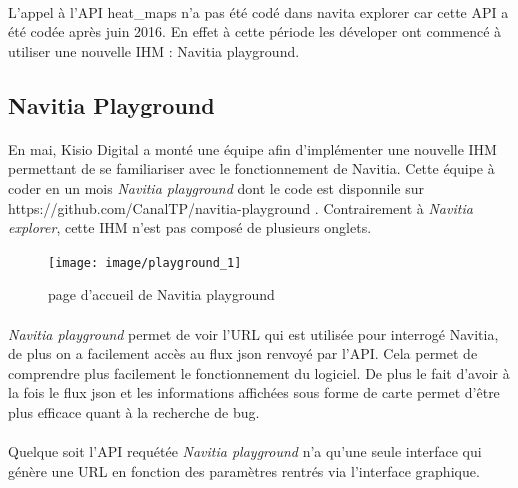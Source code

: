 \documentclass[a4paper]{report}
\begin{document}
\paragraph{} L'appel à l'API heat\_maps n'a pas été codé dans navita explorer car cette API a été codée après juin 2016. En effet à cette période les déveloper ont commencé à utiliser une nouvelle IHM : Navitia playground.


\subsection{Navitia Playground}

\paragraph{} En mai, Kisio Digital a monté une équipe afin d'implémenter une nouvelle IHM permettant de se familiariser avec le fonctionnement de Navitia. Cette équipe à coder en un mois \emph{Navitia playground} dont le code est disponnile sur \color{blue} https://github.com/CanalTP/navitia-playground \color{black}. Contrairement à \emph{Navitia explorer}, cette IHM n'est pas composé de plusieurs onglets. 

\begin{figure}[H]
	\begin{center}
		\texttt{[image: image/playground\_1]}
		\caption{page d'accueil de Navitia playground}
		\label{page d'accueil de Navitia playground}
	\end{center}
\end{figure}

\paragraph{} \emph{Navitia playground} permet de voir l'URL qui est utilisée pour interrogé Navitia, de plus on a facilement accès au flux json renvoyé par l'API. Cela permet de comprendre plus facilement le fonctionnement du logiciel. De plus le fait d'avoir à la fois le flux json et les informations affichées sous forme de carte permet d'être plus efficace quant à la recherche de bug.

\paragraph{} Quelque soit l'API requétée \emph{Navitia playground} n'a qu'une seule interface qui génère une URL en fonction des paramètres rentrés via l'interface graphique.
\end{document}
